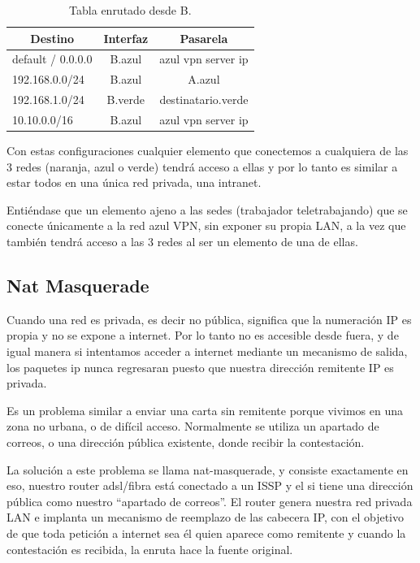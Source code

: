 \begin{table}[htb]
\begin{center}
\label{T:tabla_enrutado_B}
\caption{Tabla enrutado desde B.}
\begin{tabular}{|l|c|c|}
\hline \hline
\multicolumn{1}{|c|}{Destino} & Interfaz  & Pasarela           \\ \hline
default / 0.0.0.0             & B.azul    & azul vpn server ip \\ \hline
192.168.0.0/24                & B.azul    & A.azul     \\ \hline
192.168.1.0/24                & B.verde   & destinatario.verde          \\ \hline
10.10.0.0/16                  & B.azul     & azul vpn server ip         \\ \hline
\end{tabular}
\end{center}
\end{table}

Con estas configuraciones cualquier elemento que conectemos a cualquiera de las 3 redes (naranja, azul o verde) tendrá acceso a ellas y por lo tanto es similar a estar todos en una única red privada, una intranet.

Entiéndase que un elemento ajeno a las sedes (trabajador teletrabajando) que se conecte únicamente a la red azul VPN, sin exponer su propia LAN, a la vez que también tendrá acceso a las 3 redes al ser un elemento de una de ellas.

\subsection{Nat Masquerade}
Cuando una red es privada, es decir no pública, significa que la numeración IP es propia y no se expone a internet. Por lo tanto no es accesible desde fuera, y de igual manera si intentamos acceder a internet mediante un mecanismo de salida, los paquetes ip nunca regresaran puesto que nuestra dirección remitente IP es privada.

Es un problema similar a enviar una carta sin remitente porque vivimos en una zona no urbana, o de difícil acceso. Normalmente se utiliza un apartado de correos, o una dirección pública existente, donde recibir la contestación.

La solución a este problema se llama nat-masquerade, y consiste exactamente en eso, nuestro router adsl/fibra está conectado a un ISSP y el si tiene una dirección pública como nuestro “apartado de correos”. El router genera nuestra red privada LAN e implanta un mecanismo de reemplazo de las cabecera IP, con el objetivo de que toda petición a internet sea él quien aparece como remitente y cuando la contestación es recibida, la enruta hace la fuente original.

